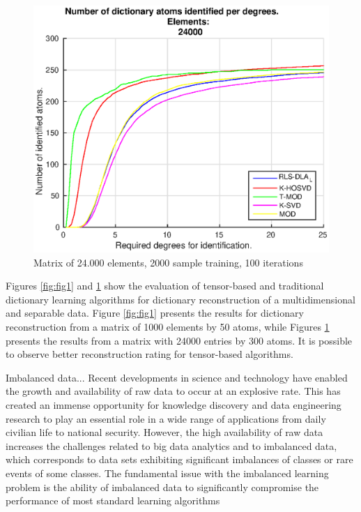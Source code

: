 \begin{figure}[!htb]
     \centering 
	 \includegraphics[width=12cm]{figures/5_20_2000_24000_100.eps}
     \caption{Matrix of 24.000 elements, 2000 sample training, 100 iterations}
     \label{fig:fig2}
\end{figure}

Figures \ref{fig:fig1} and \ref{fig:fig2} show the evaluation of tensor-based and traditional dictionary learning algorithms for dictionary reconstruction of a multidimensional and separable data. Figure \ref{fig:fig1} presents the results for dictionary reconstruction from a matrix of 1000 elements by 50 atoms, while Figures \ref{fig:fig2} presents the results from a matrix with 24000 entries by 300 atoms. It is possible to observe better reconstruction rating for tensor-based algorithms. 

Imbalanced data...
Recent developments in science and technology have enabled the growth and availability of raw data to occur at an explosive rate. This has created an immense opportunity for knowledge discovery and data engineering research to play an essential role in a wide range of applications from daily civilian life to national security. However, the high availability of raw data increases the challenges related to big data analytics and to imbalanced data, which corresponds to data sets exhibiting significant imbalances of classes or rare events of some classes. The fundamental issue with the imbalanced learning problem is the ability of imbalanced data to significantly compromise the performance of most standard learning algorithms

